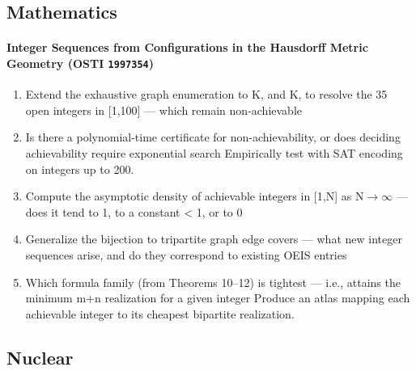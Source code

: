 \subsection*{Mathematics}
\paragraph{Integer Sequences from Configurations in the Hausdorff Metric Geometry \textnormal{\small(OSTI \texttt{1997354})}}
\begin{enumerate}[leftmargin=1.6em,itemsep=0.2em,topsep=0.2em,label=Q\arabic*.]
\item Extend the exhaustive graph enumeration to K, and K, to resolve the 35 open integers in [1,100] --- which remain non-achievable
\item Is there a polynomial-time certificate for non-achievability, or does deciding achievability require exponential search Empirically test with SAT encoding on integers up to 200.
\item Compute the asymptotic density of achievable integers in [1,N] as N$\rightarrow$$\infty$ --- does it tend to 1, to a constant \textless{} 1, or to 0
\item Generalize the bijection to tripartite graph edge covers --- what new integer sequences arise, and do they correspond to existing OEIS entries
\item Which formula family (from Theorems 10--12) is tightest --- i.e., attains the minimum m+n realization for a given integer Produce an atlas mapping each achievable integer to its cheapest bipartite realization.
\end{enumerate}
\subsection*{Nuclear}

